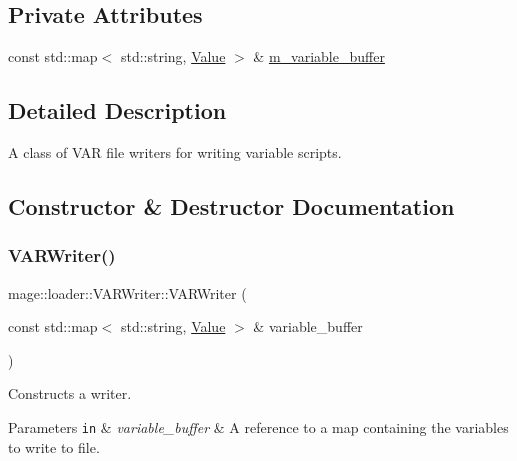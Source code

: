 \subsection*{Private Attributes}
\begin{DoxyCompactItemize}
\item 
const std\+::map$<$ std\+::string, \mbox{\hyperlink{namespacemage_a68ae02d3a746ed2f285aa2b10f131a21}{Value}} $>$ \& \mbox{\hyperlink{classmage_1_1loader_1_1_v_a_r_writer_a78b2191800987412fe5b9617923506f9}{m\+\_\+variable\+\_\+buffer}}
\end{DoxyCompactItemize}


\subsection{Detailed Description}
A class of V\+AR file writers for writing variable scripts. 

\subsection{Constructor \& Destructor Documentation}
\mbox{\label{classmage_1_1loader_1_1_v_a_r_writer_a8a90d694b8c6db85e36490005bdb546c}} 
\subsubsection{\texorpdfstring{V\+A\+R\+Writer()}{VARWriter()}\hspace{0.1cm}{\footnotesize\ttfamily [1/3]}}
{\footnotesize\ttfamily mage\+::loader\+::\+V\+A\+R\+Writer\+::\+V\+A\+R\+Writer (\begin{DoxyParamCaption}\item[{const std\+::map$<$ std\+::string, \mbox{\hyperlink{namespacemage_a68ae02d3a746ed2f285aa2b10f131a21}{Value}} $>$ \&}]{variable\+\_\+buffer }\end{DoxyParamCaption})\hspace{0.3cm}{\ttfamily [explicit]}}

Constructs a writer.


\begin{DoxyParams}[1]{Parameters}
\mbox{\tt in}  & {\em variable\+\_\+buffer} & A reference to a map containing the variables to write to file. \\
\hline
\end{DoxyParams}
\mbox{\label{classmage_1_1loader_1_1_v_a_r_writer_a5ddb3fcd75952ecc8593bc284dc3db0e}} 
